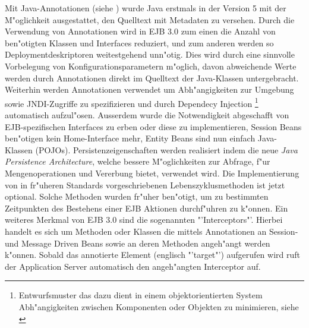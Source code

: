 Mit Java-Annotationen (siehe \cite{JAVAANNOTATIONS}) wurde Java erstmals in der Version 5 mit der M"oglichkeit ausgestattet,
den Quelltext mit Metadaten zu versehen.
Durch die Verwendung von Annotationen wird in EJB 3.0 zum einen die Anzahl von ben"otigten Klassen und Interfaces reduziert,
und zum anderen werden so Deploymentdeskriptoren weitestgehend unn"otig. Dies wird durch eine sinnvolle Vorbelegung von
Konfigurationsparametern m"oglich, davon abweichende Werte werden durch Annotationen direkt im Quelltext der Java-Klassen untergebracht.
Weiterhin werden Annotationen verwendet um Abh"angigkeiten zur Umgebung sowie JNDI-Zugriffe zu spezifizieren und durch
Dependecy Injection
\footnote{Entwurfsmuster das dazu dient in einem objektorientierten System Abh"angigkeiten zwischen Komponenten oder Objekten 
zu minimieren, siehe \cite{DEPINJ}}
automatisch aufzul"osen.
Ausserdem wurde die Notwendigkeit abgeschafft von EJB-spezifischen Interfaces zu erben oder diese zu implementieren, Session Beans
ben"otigen kein Home-Interface mehr, Entity Beans sind nun einfach Java-Klassen (POJOs). Persistenzeigenschaften werden realisiert indem
die neue \emph{Java Persistence Architecture}, welche bessere M"oglichkeiten zur Abfrage, f"ur Mengenoperationen und
Vererbung bietet, verwendet wird. Die Implementierung von in fr"uheren Standards vorgeschriebenen Lebenszyklusmethoden ist jetzt optional.
Solche Methoden wurden fr"uher ben"otigt, um zu bestimmten Zeitpunkten des Bestehens einer EJB Aktionen durchf"uhren zu k"onnen.
Ein weiteres Merkmal von EJB 3.0 sind die sogenannten "'Interceptors"'. Hierbei handelt es sich um Methoden oder Klassen die mittels
Annotationen an Session- und Message Driven Beans sowie an deren Methoden angeh"angt werden k"onnen. Sobald das annotierte Element 
(englisch "'target"') aufgerufen wird ruft der Application Server automatisch den angeh"angten Interceptor auf.



